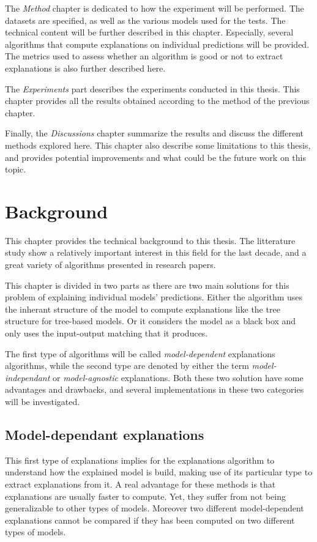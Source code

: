 \documentclass[a4paper,11pt]{kth-mag}
\begin{document}
The \textit{Method} chapter is dedicated to how the experiment will be performed. The datasets are specified, as well as the various models used for the tests. The technical content will be further described in this chapter. Especially, several algorithms that compute explanations on individual predictions will be provided. The metrics used to assess whether an algorithm is good or not to extract explanations is also further described here.

The \textit{Experiments} part describes the experiments conducted in this thesis. This chapter provides all the results obtained according to the method of the previous chapter.

Finally, the \textit{Discussions} chapter summarize the results and discuss the different methods explored here. This chapter also describe some limitations to this thesis, and provides potential improvements and what could be the future work on this topic.

\chapter{Background}

This chapter provides the technical background to this thesis. The litterature study show a relatively important interest in this field for the last decade, and a great variety of algorithms presented in research papers.

This chapter is divided in two parts as there are two main solutions for this problem of explaining individual models' predictions. Either the algorithm uses the inherant structure of the model to compute explanations like the tree structure for tree-based models. Or it considers the model as a black box and only uses the input-output matching that it produces.

The first type of algorithms will be called \textit{model-dependent} explanations algorithms, while the second type are denoted by either the term \textit{model-independant} or \textit{model-agnostic} explanations. Both these two solution have some advantages and drawbacks, and several implementations in these two categories will be investigated.

\section{Model-dependant explanations}

This first type of explanations implies for the explanations algorithm to understand how the explained model is build, making use of its particular type to extract explanations from it. A real advantage for these methods is that explanations are usually faster to compute. Yet, they suffer from not being generalizable to other types of models. Moreover two different model-dependent explanations cannot be compared if they has been computed on two different types of models.
\end{document}
